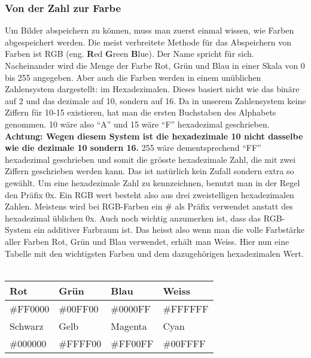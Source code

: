 \subsubsection{Von der Zahl zur Farbe}


Um Bilder abspeichern zu können, muss man zuerst einmal wissen, wie Farben abgespeichert werden. Die meist verbreitete Methode für das Abspeichern von Farben ist RGB (eng. \textbf{R}ed \textbf{G}reen \textbf{B}lue). Der Name spricht für sich. Nacheinander wird die Menge der Farbe Rot, Grün und Blau in einer Skala von 0 bis 255 angegeben. Aber auch die Farben werden in einem unüblichen Zahlensystem dargestellt: im Hexadezimalen. Dieses basiert nicht wie das binäre auf 2 und das dezimale auf 10, sondern auf 16. Da in unserem Zahlensystem keine Ziffern für 10-15 existieren, hat man die ersten Buchstaben des Alphabets genommen. 10 wäre also "`A"' und 15 wäre "`F"' hexadezimal geschrieben. \textbf{Achtung: Wegen diesem System ist die hexadezimale 10 nicht dasselbe wie die dezimale 10 sondern 16.} 255 wäre dementsprechend "`FF"' hexadezimal geschrieben und somit die grösste hexadezimale Zahl, die mit zwei Ziffern geschrieben werden kann. Das ist natürlich kein Zufall sondern extra so gewählt. Um eine hexadezimale Zahl zu kennzeichnen, benutzt man in der Regel den Präfix 0x. Ein RGB wert besteht also aus drei zweistelligen hexadezimalen Zahlen. Meistens wird bei RGB-Farben ein \# als Präfix verwendet anstatt des hexadezimal üblichen 0x. Auch noch wichtig anzumerken ist, dass das RGB-System ein additiver Farbraum ist. Das heisst also wenn man die volle Farbstärke aller Farben Rot, Grün und Blau verwendet, erhält man Weiss. Hier nun eine Tabelle mit den wichtigsten Farben und dem dazugehörigen hexadezimalen Wert. \\


\\


\begin{center}


\begin{tabular}{|l|l|l|l|}


\hline


Rot & Grün & Blau & Weiss \\ \hline


\#FF0000  & \#00FF00 & \#0000FF & \#FFFFFF \\ \hline\lstset{language=Pascal}


Schwarz & Gelb & Magenta & Cyan \\ \hline


\#000000 & \#FFFF00 & \#FF00FF & \#00FFFF \\ \hline


\end{tabular} \\


\end{center}


